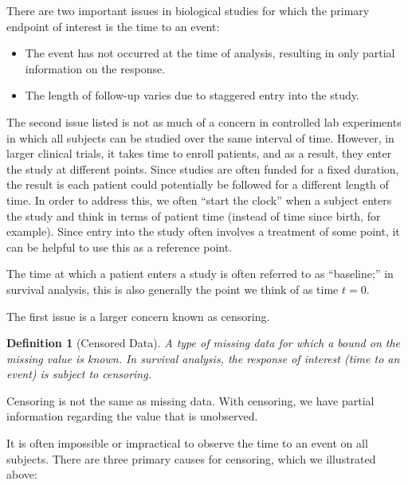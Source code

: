 \documentclass[
]{book}
\providecommand{\tightlist}{%
  \setlength{\itemsep}{0pt}\setlength{\parskip}{0pt}}
\theoremstyle{plain}
\theoremstyle{mydefn}
\newtheorem{definition}{Definition}[chapter]
\theoremstyle{myexmpl}
\theoremstyle{remark}
\begin{document}
There are two important issues in biological studies for which the primary endpoint of interest is the time to an event:

\begin{itemize}
\tightlist
\item
  The event has not occurred at the time of analysis, resulting in only partial information on the response.
\item
  The length of follow-up varies due to staggered entry into the study.
\end{itemize}

The second issue listed is not as much of a concern in controlled lab experiments in which all subjects can be studied over the same interval of time. However, in larger clinical trials, it takes time to enroll patients, and as a result, they enter the study at different points. Since studies are often funded for a fixed duration, the result is each patient could potentially be followed for a different length of time. In order to address this, we often ``start the clock'' when a subject enters the study and think in terms of patient time (instead of time since birth, for example). Since entry into the study often involves a treatment of some point, it can be helpful to use this as a reference point.

\begin{rmdtip}
The time at which a patient enters a study is often referred to as ``baseline;'' in survival analysis, this is also generally the point we think of as time \(t = 0\).
\end{rmdtip}

The first issue is a larger concern known as censoring.

\begin{definition}[Censored Data]
A type of missing data for which a bound on the missing value is known. In survival analysis, the response of interest (time to an event) is subject to censoring.
\end{definition}

\begin{rmdwarning}
Censoring is not the same as missing data. With censoring, we have partial information regarding the value that is unobserved.
\end{rmdwarning}

It is often impossible or impractical to observe the time to an event on all subjects. There are three primary causes for censoring, which we illustrated above:
\end{document}
